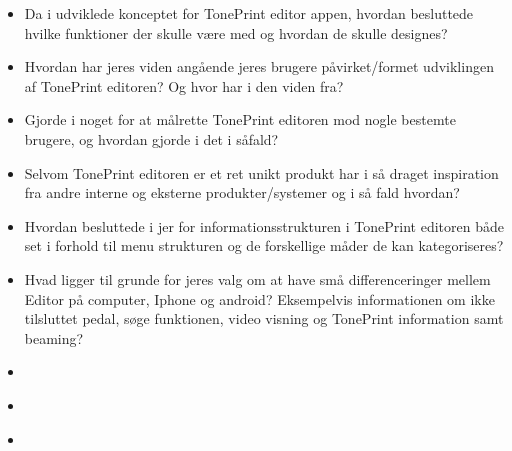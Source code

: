 \begin{itemize}
  \item Da i udviklede konceptet for TonePrint editor appen, hvordan besluttede hvilke funktioner der skulle være med og hvordan de skulle designes?
  \item Hvordan har jeres viden angående jeres brugere påvirket/formet udviklingen af TonePrint editoren? Og hvor har i den viden fra?
  \item Gjorde i noget for at målrette TonePrint editoren mod nogle bestemte brugere, og hvordan gjorde i det i såfald?
  \item Selvom TonePrint editoren er et ret unikt produkt har i så draget inspiration fra andre interne og eksterne produkter/systemer og i så fald hvordan?
\end{itemize}

\begin{itemize}
  \item Hvordan besluttede i jer for informationsstrukturen i TonePrint editoren både set i forhold til menu strukturen og de forskellige måder de kan kategoriseres?
  \item Hvad ligger til grunde for jeres valg om at have små differenceringer mellem Editor på computer, Iphone og android? Eksempelvis informationen om ikke tilsluttet pedal, søge funktionen, video visning og TonePrint information samt beaming?
  \item 
  \item 
  \item 
\end{itemize}


